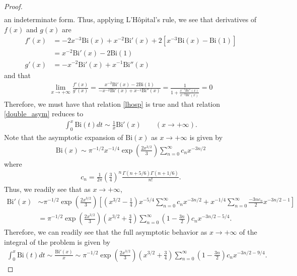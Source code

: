 \documentclass[12pt]{article}
\theoremstyle{definition}
\newcommand{\bairy}{\text{Bi}}
\begin{document}
\begin{proof}
\begin{align*}
  \end{align*}
  an indeterminate form. Thus, applying L\rq H\^opital's rule, we see that derivatives of $f(x)$ and $g(x)$ are
  \begin{align*}
    f'(x) &= -2x^{-3}\bairy(x) + x^{-2}\bairy'(x) + 2\left[x^{-3}\bairy(x) - \bairy(1) \right] \\
    &= x^{-2}\bairy'(x) - 2 \bairy(1) \\
    g'(x) &= -x^{-2}\bairy'(x) + x^{-1}\bairy''(x)
  \end{align*}
  and that
  \begin{align*}
    \lim_{x\to + \infty}\frac{f'(x)}{g'(x)} =\frac{x^{-2}\bairy'(x) -2\bairy(1)}{-x^{-2}\bairy'(x) + x^{-1}\bairy''(x)} = \frac{1}{1 + \frac{x^{-1}\bairy''(x)}{x^{-2}\bairy'(x)}} = 0
  \end{align*}
  Therefore, we must have that relation \eqref{lhosp} is true and that relation \eqref{double_asym} reduces to
  \begin{align*}
    \int_0^x \bairy(t) dt \sim \frac{1}{x}\bairy'(x) \qquad (x \to +\infty).
  \end{align*}
  Note that the asymptotic expansion of $\bairy(x)$ as $x \to +\infty$ is given by
  \begin{align*}
    \bairy(x) \sim \pi^{-1/2}x^{-1/4} \exp{\left(\frac{2x^{3/2}}{3}\right)} \sum_{n=0}^\infty c_n x^{-3n/2}
  \end{align*}
  where
  \begin{align*}
    c_n = \frac{1}{2\pi}\left(\frac{3}{4}\right)^n \frac{\Gamma(n + 5/6)\Gamma(n + 1/6)}{n!}.
  \end{align*}
  Thus, we readily see that as $x \to +\infty$,
  \begin{align*}
    \bairy'(x) &\sim \pi^{-1/2}\exp{\left(\frac{2x^{3/2}}{3}\right)}\left[\left(x^{3/2} - \frac{1}{4}\right)x^{-5/4} \sum_{n=0}^{\infty}c_n x^{-3n/2}  + x^{-1/4}\sum_{n=0}^{\infty}\frac{-3n c_n}{2} x^{-3n/2 - 1}\right] \\
    &= \pi^{-1/2}\exp{\left(\frac{2x^{3/2}}{3}\right)}\left(x^{3/2} + \frac{3}{4}\right)\sum_{n=0}^{\infty}\left(1 - \frac{3n}{2}\right)c_n x^{-3n/2-5/4}.
  \end{align*}
  Therefore, we can readily see that the full asymptotic behavior as $x \to +\infty$ of the integral of the problem is given by
  \begin{align*}
    \int_0^x \bairy(t) dt \sim     \frac{\bairy'(x)}{x} \sim \pi^{-1/2}\exp{\left(\frac{2x^{3/2}}{3}\right)}\left(x^{3/2} + \frac{3}{4}\right)\sum_{n=0}^{\infty}\left(1 - \frac{3n}{2}\right)c_n x^{-3n/2-9/4}.
  \end{align*}
\end{proof}
\newpage
\end{document}
